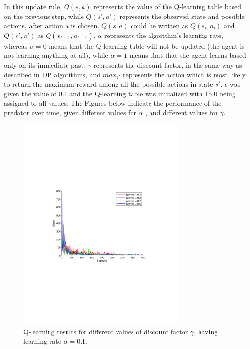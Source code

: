 \documentclass[a4paper,11pt]{article}
\begin{document}
In this update rule, $Q(s,a)$ represents the value of the Q-learning table based on the previous step, while $Q(s',a')$ represents the observed state and possible actions, after action a is chosen. $Q(s,a)$ could be written as $Q(s_t,a_t)$ and $Q(s',a')$ as $Q(s_{t+1}, a_{t+1})$. $\alpha$ represents the algorithm's learning rate, whereas $\alpha =0$ means that the Q-learning table will not be updated (the agent is not learning anything at all), while $\alpha =1$ means that that the agent learns based only on its immediate past. $\gamma$ represents the discount factor, in the same way as described in DP algorithms, and $max_{a'}$ represents the action which is most likely to return the maximum reward among all the possible actions in state $s'$. $\epsilon$ was given the value of 0.1 and the Q-learning table was initialized with 15.0 being assigned to all values. The Figures below indicate the performance of the predator over time, given different values for $\alpha$ , and different values for $\gamma$.
\begin{figure}[h!]
  \centering
    \includegraphics[trim=4cm 8.5cm 4cm 8.5cm,clip,width=0.75\textwidth]{figures/qla01.pdf}
    \caption{Q-learning results for different values of discount factor $\gamma$, having learning rate $\alpha = 0.1$.}
    \label{q01}
\end{figure}
~
\end{document}
